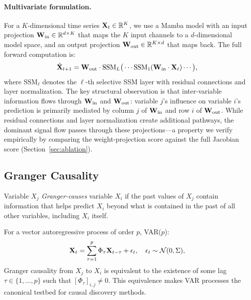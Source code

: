 \paragraph{Multivariate formulation.}
For a $K$-dimensional time series $\mathbf{X}_t \in \mathbb{R}^K$, we use a Mamba
model with an input projection $\mathbf{W}_{\text{in}} \in \mathbb{R}^{d \times K}$
that maps the $K$ input channels to a $d$-dimensional model space, and
an output projection $\mathbf{W}_{\text{out}} \in \mathbb{R}^{K \times d}$ that maps
back. The full forward computation is:
\begin{equation}
    \hat{\mathbf{X}}_{t+1} = \mathbf{W}_{\text{out}} \cdot \text{SSM}_L
    \big( \cdots \text{SSM}_1(\mathbf{W}_{\text{in}} \cdot \mathbf{X}_t) \cdots \big),
    \label{eq:full_forward}
\end{equation}
where $\text{SSM}_\ell$ denotes the $\ell$-th selective SSM layer with
residual connections and layer normalization. The key structural observation is that inter-variable information
flows through $\mathbf{W}_{\text{in}}$ and $\mathbf{W}_{\text{out}}$: variable $j$'s
influence on variable $i$'s prediction is primarily mediated by column
$j$ of $\mathbf{W}_{\text{in}}$ and row $i$ of $\mathbf{W}_{\text{out}}$. While
residual connections and layer normalization create additional pathways,
the dominant signal flow passes through these projections---a property
we verify empirically by comparing the weight-projection score against
the full Jacobian score (Section~\ref{sec:ablation}).

\subsection{Granger Causality}

\begin{definition}
\label{def:granger}
Variable $X_j$ \emph{Granger-causes} variable $X_i$ if the past values
of $X_j$ contain information that helps predict $X_i$ beyond what is
contained in the past of all other variables, including $X_i$ itself.
\end{definition}

For a vector autoregressive process of order $p$, VAR($p$):
\begin{equation}
    \mathbf{X}_t = \sum_{\tau=1}^{p} \Phi_\tau \mathbf{X}_{t-\tau} + \epsilon_t,
    \quad \epsilon_t \sim \mathcal{N}(0, \Sigma),
    \label{eq:var_p}
\end{equation}
Granger causality from $X_j$ to $X_i$ is equivalent to the existence of
some lag $\tau \in \{1, \ldots, p\}$ such that $[\Phi_\tau]_{i,j} \neq 0$.
This equivalence makes VAR processes the canonical testbed for causal
discovery methods.

